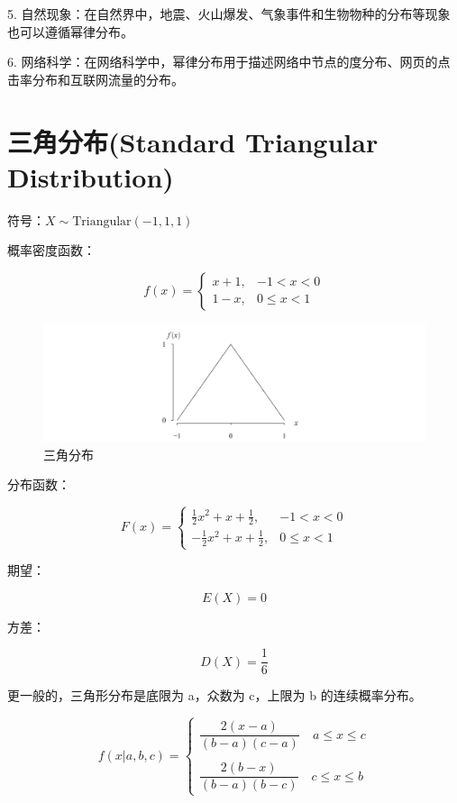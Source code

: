 \documentclass[12pt, a4paper, oneside]{ctexbook}
\begin{document}
5. 自然现象：在自然界中，地震、火山爆发、气象事件和生物物种的分布等现象也可以遵循幂律分布。

6. 网络科学：在网络科学中，幂律分布用于描述网络中节点的度分布、网页的点击率分布和互联网流量的分布。

\section{三角分布(Standard Triangular Distribution)}

 符号：$X \sim \text{Triangular}(-1, 1, 1)$

 概率密度函数：

$$
f(x) = \begin{cases}
x + 1, &-1 < x < 0 \\
1 - x, & 0 \leq x < 1
\end{cases}
$$

\begin{figure}[H]
  \centering
  \includegraphics[width=1\textwidth]{image/三角分布.png}
  \caption{三角分布}
  \label{fig:example}
\end{figure}

 分布函数：

$$
F(x) = \begin{cases}
\frac{1}{2}x^{2} + x + \frac{1}{2}, &-1 < x < 0 \\
-\frac{1}{2}x^{2} + x + \frac{1}{2}, &0 \leq x < 1
\end{cases}
$$

 期望：

$$
E(X) = 0
$$

 方差：

$$
D(X) = \dfrac{1}{6}
$$

更一般的，三角形分布是底限为 a，众数为 c，上限为 b 的连续概率分布。

$$
f(x|a, b, c) = \begin{cases}
\dfrac{2(x - a)}{(b - a)(c - a)} \quad a \leq x \leq c \\
\\
\dfrac{2(b - x)}{(b - a)(b - c)} \quad c \leq x \leq b
\end{cases}
$$
\end{document}
